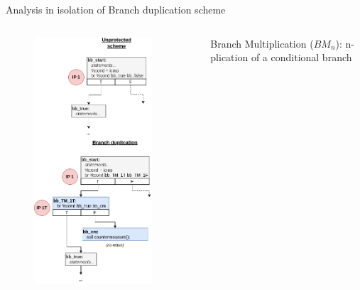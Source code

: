 \begin{frame}[fragile]{Analysis in isolation of Branch duplication scheme}
    \begin{columns}
        \begin{column}{0.25\textwidth}
            \begin{figure}
                \includegraphics[scale=0.25]{img/branch-mul.png}
            \end{figure}
            \vfill
        \end{column}
        \begin{column}{0.04\textwidth} \end{column}
        \begin{small}
            \begin{column}{0.7\textwidth}
                Branch Multiplication ($BM_n$): n-plication of a conditional branch
                \vspace{0.3cm}
                

\end{column}
\end{small}
\end{columns}
\end{frame}
